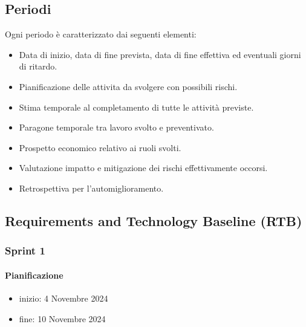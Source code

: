 \documentclass{article}
\begin{document}
    \subsection{Periodi}
    Ogni periodo è caratterizzato dai seguenti elementi:
    \begin{itemize}
        \item Data di inizio, data di fine prevista, data di fine effettiva ed eventuali giorni di ritardo.
        \item Pianificazione delle attivita da svolgere con possibili rischi.
        \item Stima temporale al completamento di tutte le attività previste.
        \item Paragone temporale tra lavoro svolto e preventivato.
        \item Prospetto economico relativo ai ruoli svolti.
        \item Valutazione impatto e mitigazione dei rischi effettivamente occorsi.
        \item Retrospettiva per l'automiglioramento.
    \end{itemize}


        \subsection{Requirements and Technology Baseline (RTB)}
            \subsubsection{Sprint 1}
                \paragraph{Pianificazione}
                \begin{itemize}
                    \item inizio: 4 Novembre 2024
                    \item fine: 10 Novembre 2024
                \end{itemize}
                
\end{document}
